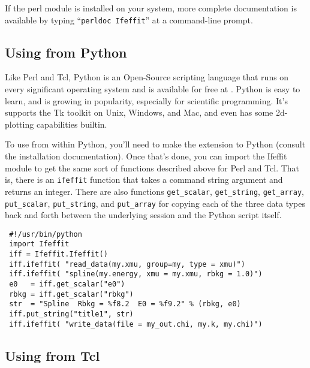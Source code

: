 If the {\ifeffit} perl module is installed on your
system, more complete documentation is available by typing
``{\texttt{perldoc Ifeffit}}'' at a command-line prompt.

\subsection{Using {\ifeffit} from Python}\label{Ch:Scripting-python}

Like Perl and Tcl, Python is an Open-Source scripting language that runs on
every significant operating system and is available for free at
{\WWWpython}.  Python is easy to learn, and is growing in popularity,
especially for scientific programming.  It's supports the Tk toolkit on
Unix, Windows, and Mac, and even has some 2d-plotting capabilities builtin.

To use {\ifeffit} from within Python, you'll need to make the {\ifeffit}
extension to Python (consult the installation documentation).  Once that's
done, you can import the Ifeffit module to get the same sort of functions
described above for Perl and Tcl.  That is, there is an {\tt{ifeffit}}
function that takes a command string argument and returns an integer.
There are also functions {\tt{get\_scalar}}, {\tt{get\_string}},
{\tt{get\_array}}, {\tt{put\_scalar}}, {\tt{put\_string}}, and
{\tt{put\_array}} for copying each of the three data types back and forth
between the underlying {\ifeffit} session and the Python script itself.


\begin{verbatim}
 #!/usr/bin/python
 import Ifeffit
 iff = Ifeffit.Ifeffit()
 iff.ifeffit( "read_data(my.xmu, group=my, type = xmu)")
 iff.ifeffit( "spline(my.energy, xmu = my.xmu, rbkg = 1.0)")
 e0   = iff.get_scalar("e0")
 rbkg = iff.get_scalar("rbkg")
 str  = "Spline  Rbkg = %f8.2  E0 = %f9.2" % (rbkg, e0)
 iff.put_string("title1", str)
 iff.ifeffit( "write_data(file = my_out.chi, my.k, my.chi)")
\end{verbatim} %


\subsection{Using {\ifeffit} from Tcl}\label{Ch:Scripting-tcl}

